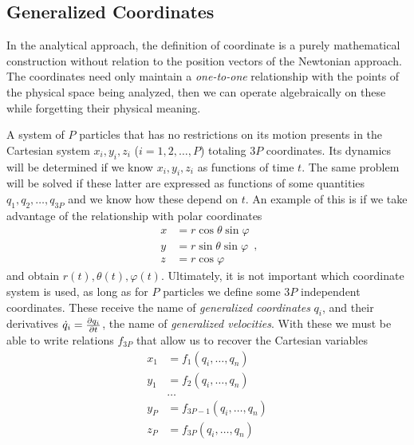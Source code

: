 \documentclass[12pt, english, a4paper]{article}
\begin{document}
\subsection{Generalized Coordinates}\label{generalized}
In the analytical approach, the definition of coordinate is a purely mathematical construction without relation to the position vectors of the Newtonian approach.
The coordinates need only maintain a \emph{one-to-one} relationship with the points of the physical space being analyzed, then we can operate algebraically on these while forgetting their physical meaning.

A system of \(P\) particles that has no restrictions on its motion presents in the Cartesian system \(x_i, y_i, z_i\) (\(i=1, 2, \ldots, P\)) totaling \(3P\) coordinates.
Its dynamics will be determined if we know \(x_i, y_i, z_i\) as functions of time \(t\).
The same problem will be solved if these latter are expressed as functions of some quantities \(q_1, q_2, \ldots, q_{3P}\) and we know how these depend on \(t\).
An example of this is if we take advantage of the relationship with polar coordinates
\begin{equation}\label{Lanczos12.3}
	\begin{aligned}
		x &= r \cos{\theta} \sin{\varphi}\\
		y &= r \sin{\theta} \sin{\varphi}\\
		z &= r \cos{\varphi}
	\end{aligned},
	\tag{Lanczos 12.3}
\end{equation}
and obtain \(r(t), \theta(t), \varphi(t)\).
Ultimately, it is not important which coordinate system is used, as long as for \(P\) particles we define some \(3P\) independent coordinates.
These receive the name of \emph{generalized coordinates} \(q_i\), and their derivatives \(\dot{q}_i= \pdv{q_i}{t}\), the name of \emph{generalized velocities}.
With these we must be able to write relations \(f_{3P}\) that allow us to recover the Cartesian variables
\begin{equation}\label{Lanczos12.8}
	\begin{aligned}
		x_1 &= f_1(q_i, \ldots, q_n) \\
		y_1 &= f_2(q_i, \ldots, q_n) \\
		& \ldots \\
		y_P &= f_{3P-1}(q_i, \ldots, q_n) \\
		z_P &= f_{3P}(q_i, \ldots, q_n)
	\end{aligned}
	\tag{Lanczos 12.8}
\end{equation}
\end{document}
